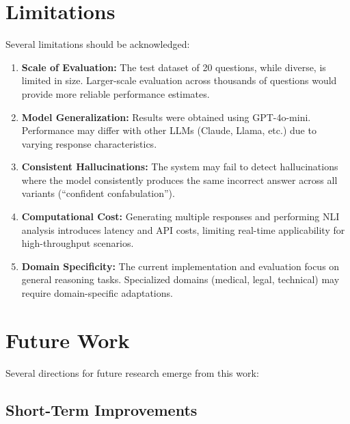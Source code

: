 \section{Limitations}

Several limitations should be acknowledged:

\begin{enumerate}
    \item \textbf{Scale of Evaluation:} The test dataset of 20 questions, while diverse, is limited in size. Larger-scale evaluation across thousands of questions would provide more reliable performance estimates.

    \item \textbf{Model Generalization:} Results were obtained using GPT-4o-mini. Performance may differ with other LLMs (Claude, Llama, etc.) due to varying response characteristics.

    \item \textbf{Consistent Hallucinations:} The system may fail to detect hallucinations where the model consistently produces the same incorrect answer across all variants (``confident confabulation'').

    \item \textbf{Computational Cost:} Generating multiple responses and performing NLI analysis introduces latency and API costs, limiting real-time applicability for high-throughput scenarios.

    \item \textbf{Domain Specificity:} The current implementation and evaluation focus on general reasoning tasks. Specialized domains (medical, legal, technical) may require domain-specific adaptations.
\end{enumerate}

\section{Future Work}

Several directions for future research emerge from this work:

\subsection{Short-Term Improvements}

